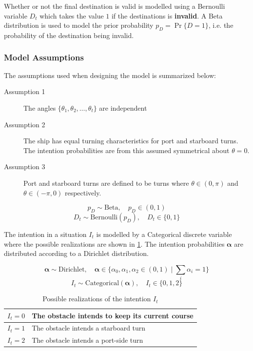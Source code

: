 Whether or not the final destination is valid is modelled using a Bernoulli variable $D_t$ which takes the value $1$ if the destinations is \textbf{invalid}. A Beta distribution is used to model the prior probability $p_D = \Pr \{D=1\}$, i.e. the probability of the destination being invalid.  

\subsubsection{Model Assumptions}
The assumptions used when designing the model is summarized below:
\begin{description}
    \item[Assumption 1] The angles $\{\theta_1, \theta_2, \dots, \theta_t\}$ are independent
    \item[Assumption 2] The ship has equal turning characteristics for port and starboard turns. The intention probabilities are from this assumed symmetrical about $\theta=0$. 
    \item[Assumption 3] Port and starboard turns are defined to be turns where $\theta \in (0, \pi)$ and $\theta \in (-\pi, 0)$ respectively.  
\end{description}

\begin{equation}
    p_D \sim \text{Beta}, \quad p_D \in (0, 1)
\end{equation}
\begin{equation}
    D_t \sim \text{Bernoulli}(p_D), \quad D_t \in \{0, 1\}
\end{equation}

The intention in a situation $I_t$ is modelled by a Categorical discrete variable where the possible realizations are shown in \cref{tbl:intentions}. The intention probabilities $\boldsymbol{\alpha}$ are distributed according to a Dirichlet distribution.

\begin{equation}
    \boldsymbol{\alpha} \sim \text{Dirichlet}, \quad \boldsymbol{\alpha} \in \{\alpha_0, \alpha_1, \alpha_2 \in (0, 1) \; | \; \sum_i \alpha_i = 1 \}
\end{equation}
\begin{equation}
    I_t \sim \text{Categorical}(\boldsymbol{\alpha}), \quad I_t \in \{0, 1, 2\}
\end{equation}

\begin{table}[h]
\centering
\begin{tabular}{|l|l|}
\hline
$I_t=0$ & The obstacle intends to keep its current course \\ \hline
$I_t=1$ & The obstacle intends a starboard turn           \\ \hline
$I_t=2$ & The obstacle intends a port-side turn            \\ \hline
\end{tabular}
\caption{Possible realizations of the intention $I_t$}
\label{tbl:intentions}
\end{table}


